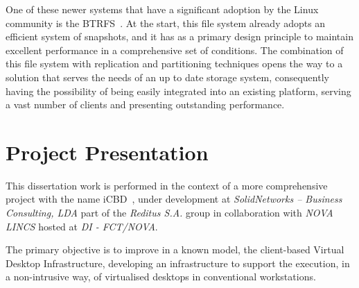 
One of these newer systems that have a significant adoption by the Linux community is the BTRFS~\cite{Rodeh2013}. At the start, this file system already adopts an efficient system of snapshots, and it has as a primary design principle to maintain excellent performance in a comprehensive set of conditions.
The combination of this file system with replication and partitioning techniques opens the way to a solution that serves the needs of an up to date storage system, consequently having the possibility of being easily integrated into an existing platform, serving a vast number of clients and presenting outstanding performance. 



\section{Project Presentation} %
\label{sec:project_presentation}

This dissertation work is performed in the context of a more comprehensive project with the name \gls{iCBD}~\cite{Lopes2017}, under development at \textit{SolidNetworks – Business Consulting, LDA} part of the \textit{Reditus S.A.} group in collaboration with \textit{NOVA LINCS} hosted at \textit{DI - FCT/NOVA}.

The primary objective is to improve in a known model, the client-based Virtual Desktop Infrastructure, developing an infrastructure to support the execution, in a non-intrusive way, of virtualised desktops in conventional workstations.


